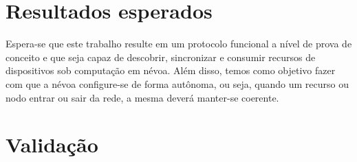 



\section{Resultados esperados}

Espera-se que este trabalho resulte em um protocolo funcional a nível de prova de conceito e que seja capaz de descobrir, sincronizar e consumir recursos de dispositivos sob computação em névoa.
Além disso, temos como objetivo fazer com que a névoa configure-se de forma autônoma, ou seja, quando um recurso ou nodo entrar ou sair da rede, a mesma deverá manter-se coerente.


\section{Validação}

